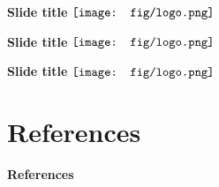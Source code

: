 \documentclass{beamer}
\begin{document}
\begin{frame}{\textbf{Slide title} \hspace{0pt plus 1 filll} $\vcenter{\hbox{\texttt{[image: fig/logo.png]}}}$}

\end{frame}

\begin{frame}{\textbf{Slide title} \hspace{0pt plus 1 filll} $\vcenter{\hbox{\texttt{[image: fig/logo.png]}}}$}

\end{frame}

\begin{frame}{\textbf{Slide title} \hspace{0pt plus 1 filll} $\vcenter{\hbox{\texttt{[image: fig/logo.png]}}}$}

\end{frame}


\section{References}

\begin{frame}[t]{\textbf{References}}
% 
% 
\end{frame}
\end{document}
